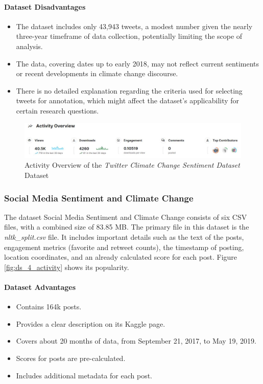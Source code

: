 \paragraph{Dataset Disadvantages}
\begin{itemize}
    \item The dataset includes only 43,943 tweets, a modest number given the nearly three-year  timeframe of data collection, potentially limiting the scope of analysis.
    \item The data, covering dates up to early 2018, may not reflect current sentiments or recent developments in climate change discourse.
    \item There is no detailed explanation regarding the criteria used for selecting tweets for annotation, which might affect the dataset's applicability for certain research questions.
\end{itemize}

\begin{figure}[h]
    \includegraphics[width=\textwidth]{images/dataset/ds_3_activity.JPG}
    \caption{Activity Overview of the \emph{Twitter Climate Change Sentiment Dataset} Dataset\protect\footnotemark}
    \label{fig:ds_3_activity}
\end{figure}

\subsubsection{Social Media Sentiment and Climate Change}
The dataset Social Media Sentiment and Climate Change \cite{SocialMediaSentimentAndClimateChange} consists of six CSV files, with a combined size of 83.85 MB. The primary file in this dataset is the \emph{nltk\_split.csv} file. It includes important details such as the text of the posts, engagement metrics (favorite and retweet counts), the timestamp of posting, location coordinates, and an already calculated score for each post. Figure \ref{fig:ds_4_activity} shows its popularity.

\paragraph{Dataset Advantages}
\begin{itemize}
    \item Contains 164k posts.
    \item Provides a clear description on its Kaggle page.
    \item Covers about 20 months of data, from September 21, 2017, to May 19, 2019.
    \item Scores for posts are pre-calculated.
    \item Includes additional metadata for each post.
\end{itemize}


